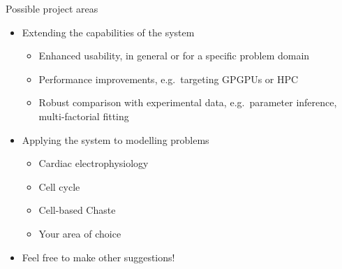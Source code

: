 \documentclass[t,xcolor={usenames,dvipsnames}]{beamer}
\begin{document}
\begin{frame}{Possible project areas}
\begin{itemize}
\item Extending the capabilities of the system
  \begin{itemize}
  \item Enhanced usability, in general or for a specific problem domain
  \item Performance improvements, e.g.\ targeting GPGPUs or HPC
  \item Robust comparison with experimental data, e.g.\ parameter inference, multi-factorial fitting
  \end{itemize}
\item Applying the system to modelling problems
  \begin{itemize}
  \item Cardiac electrophysiology
  \item Cell cycle
  \item Cell-based Chaste
  \item Your area of choice
  \end{itemize}
\item Feel free to make other suggestions!
\end{itemize}
\end{frame}
\end{document}
